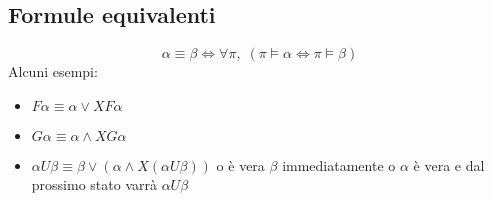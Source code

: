 \subsection{Formule equivalenti}
\[\alpha \equiv \beta \Leftrightarrow \forall \pi, \; (\pi \vDash \alpha \Leftrightarrow \pi \vDash \beta) \]
Alcuni esempi:
\begin{itemize}
    \item $F \alpha \equiv \alpha \lor XF\alpha$	
    \item $G \alpha \equiv \alpha \land XG\alpha$
    \item $\alpha U \beta \equiv \beta \lor (\alpha \land X (\alpha U \beta))$	o è vera $\beta$ immediatamente o $\alpha$ è vera e dal prossimo stato varrà $\alpha U \beta$
\end{itemize}

